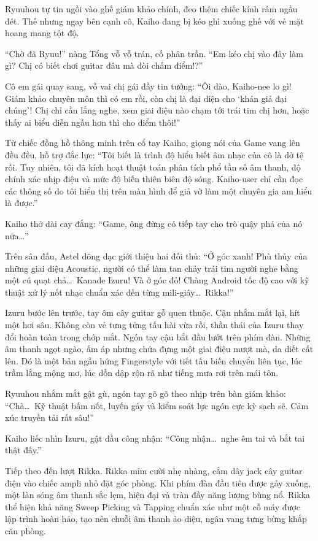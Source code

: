 \documentclass[../main.tex]{subfiles}
\begin{document}
Ryuuhou tự tin ngồi vào ghế giám khảo chính, đeo thêm chiếc kính râm ngầu đét. Thế nhưng ngay bên cạnh cô, Kaiho đang bị kéo ghì xuống ghế với vẻ mặt hoang mang tột độ.

``Chờ đã Ryuu!'' nàng Tổng vỗ vỗ trán, cố phân trần. ``Em kéo chị vào đây làm gì? Chị có biết chơi guitar đâu mà đòi chấm điểm!?''

Cô em gái quay sang, vỗ vai chị gái đầy tin tưởng: ``Ôi dào, Kaiho-nee lo gì! Giám khảo chuyên môn thì có em rồi, còn chị là đại diện cho `khán giả đại chúng'! Chị chỉ cần lắng nghe, xem giai điệu nào chạm tới trái tim chị hơn, hoặc thấy ai biểu diễn ngầu hơn thì cho điểm thôi!''

Từ chiếc đồng hồ thông minh trên cổ tay Kaiho, giọng nói của Game vang lên đều đều, hỗ trợ đắc lực: ``Tôi biết là trình độ hiểu biết âm nhạc của cô là dở tệ rồi. Tuy nhiên, tôi đã kích hoạt thuật toán phân tích phổ tần số âm thanh, độ chính xác nhịp điệu và mức độ biến thiên biên độ sóng. Kaiho-user chỉ cần đọc các thông số do tôi hiển thị trên màn hình để giả vờ làm một chuyên gia am hiểu là được.''

Kaiho thở dài cay đắng: ``Game, ông đừng có tiếp tay cho trò quậy phá của nó nữa\dots''

Trên sân đấu, Astel dõng dạc giới thiệu hai đối thủ: ``Ở góc xanh! Phù thủy của những giai điệu Acoustic, người có thể làm tan chảy trái tim người nghe bằng một cú quạt chả\dots\ Kanade Izuru! Và ở góc đỏ! Chàng Android tốc độ cao với kỹ thuật xử lý nốt nhạc chuẩn xác đến từng mili-giây\dots\ Rikka!''

Izuru bước lên trước, tay ôm cây guitar gỗ quen thuộc. Cậu nhắm mắt lại, hít một hơi sâu. Không còn vẻ tưng tửng tấu hài vừa rồi, thần thái của Izuru thay đổi hoàn toàn trong chớp mắt. Ngón tay cậu bắt đầu lướt trên phím đàn. Những âm thanh ngọt ngào, ấm áp nhưng chứa đựng một giai điệu mượt mà, da diết cất lên. Đó là một bản ngẫu hứng Fingerstyle với tiết tấu biến chuyển liên tục, lúc trầm lắng mộng mơ, lúc dồn dập rộn rã như tiếng mưa rơi trên mái tôn.

Ryuuhou nhắm mắt gật gù, ngón tay gõ gõ theo nhịp trên bàn giám khảo: ``Chà\dots\ Kỹ thuật bấm nốt, luyến gảy và kiểm soát lực ngón cực kỳ sạch sẽ. Cảm xúc truyền tải rất sâu!''

Kaiho liếc nhìn Izuru, gật đầu công nhận: ``Công nhận\dots\ nghe êm tai và bắt tai thật đấy.''

Tiếp theo đến lượt Rikka. Rikka mỉm cười nhẹ nhàng, cắm dây jack cây guitar điện vào chiếc ampli nhỏ đặt góc phòng. Khi phím đàn đầu tiên được gảy xuống, một làn sóng âm thanh sắc lẹm, hiện đại và tràn đầy năng lượng bùng nổ. Rikka thể hiện khả năng Sweep Picking và Tapping chuẩn xác như một cỗ máy được lập trình hoàn hảo, tạo nên chuỗi âm thanh ảo diệu, ngân vang tưng bừng khắp căn phòng.
\end{document}
